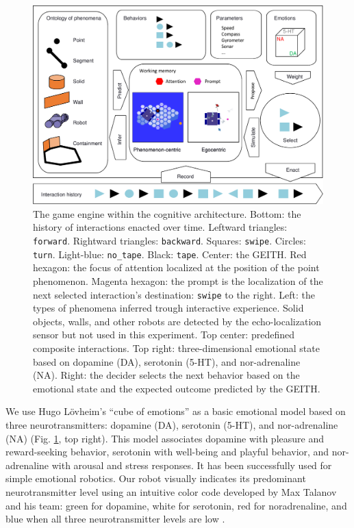 \documentclass[runningheads]{llncs}
\begin{document}
\begin{figure}
	\includegraphics[width=\textwidth]{Figure_geith.pdf}
	\caption{The game engine within the cognitive architecture.
		Bottom: the history of interactions enacted over time.
		Leftward triangles: \texttt{forward}. Rightward triangles: \texttt{backward}. Squares: \texttt{swipe}. Circles: \texttt{turn}. Light-blue: \texttt{no\_tape}. Black: \texttt{tape}.
		Center: the GEITH.
		Red hexagon: the focus of attention localized at the position of the point phenomenon. 
		Magenta hexagon: the prompt is the localization of the next selected interaction's destination: \texttt{swipe} to the right.
		Left: the types of phenomena inferred trough interactive experience.
		Solid objects, walls, and other robots are detected by the echo-localization sensor but not used in this experiment.
		Top center: predefined composite interactions.
		Top right: three-dimensional emotional state based on dopamine (DA), serotonin (5-HT), and nor-adrenaline (NA).
		Right: the decider selects the next behavior based on the emotional state and the expected outcome predicted by the GEITH.} \label{fig:geith}
\end{figure}

We use Hugo Lövheim's ``cube of emotions'' \cite{lovheim_new_2012} as a basic emotional model based on three neurotransmitters: dopamine (DA), serotonin (5-HT), and nor-adrenaline (NA) (Fig. \ref{fig:geith}, top right).
This model associates dopamine with pleasure and reward-seeking behavior, serotonin with well-being and playful behavior, and nor-adrenaline with arousal and stress responses.
It has been successfully used for simple emotional robotics.
Our robot visually indicates its predominant neurotransmitter level using an intuitive color code developed by Max Talanov and his team: green for dopamine, white for serotonin, red for noradrenaline, and blue when all three neurotransmitter levels are low \cite{chebotareva_emotional_2019}.
\end{document}
